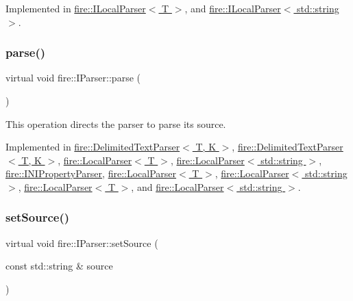 Implemented in \hyperlink{a00762_ad46898c516adcce38acbb4800dc9777b}{fire\+::\+I\+Local\+Parser$<$ T $>$}, and \hyperlink{a00762_ad46898c516adcce38acbb4800dc9777b}{fire\+::\+I\+Local\+Parser$<$ std\+::string $>$}.

\mbox{\label{a00770_af36ac6eedd8c27d2f418869193d7d03c}} 
\subsubsection{\texorpdfstring{parse()}{parse()}}
{\footnotesize\ttfamily virtual void fire\+::\+I\+Parser\+::parse (\begin{DoxyParamCaption}{ }\end{DoxyParamCaption})\hspace{0.3cm}{\ttfamily [pure virtual]}}

This operation directs the parser to parse its source. 

Implemented in \hyperlink{a00758_a773fa7ed28cb9d8c384ad94bd81fc93f}{fire\+::\+Delimited\+Text\+Parser$<$ T, K $>$}, \hyperlink{a00758_a686df5548771cae833d5e721442a821a}{fire\+::\+Delimited\+Text\+Parser$<$ T, K $>$}, \hyperlink{a00778_abd8929aea06c2dda40256d2e58236650}{fire\+::\+Local\+Parser$<$ T $>$}, \hyperlink{a00778_abd8929aea06c2dda40256d2e58236650}{fire\+::\+Local\+Parser$<$ std\+::string $>$}, \hyperlink{a00766_a31b6bad01e65ed4bb5f1ba297616c641}{fire\+::\+I\+N\+I\+Property\+Parser}, \hyperlink{a00778_ae904e264fe16708b3e434adea59e1b88}{fire\+::\+Local\+Parser$<$ T $>$}, \hyperlink{a00778_ae904e264fe16708b3e434adea59e1b88}{fire\+::\+Local\+Parser$<$ std\+::string $>$}, \hyperlink{a00778_a34fd9ffb0196c612c75b5288ed5e219b}{fire\+::\+Local\+Parser$<$ T $>$}, and \hyperlink{a00778_a34fd9ffb0196c612c75b5288ed5e219b}{fire\+::\+Local\+Parser$<$ std\+::string $>$}.

\mbox{\label{a00770_a0dbeff2b9bd8dbfb2aad7a424eef87d1}} 
\subsubsection{\texorpdfstring{set\+Source()}{setSource()}\hspace{0.1cm}{\footnotesize\ttfamily [1/2]}}
{\footnotesize\ttfamily virtual void fire\+::\+I\+Parser\+::set\+Source (\begin{DoxyParamCaption}\item[{const std\+::string \&}]{source }\end{DoxyParamCaption})\hspace{0.3cm}{\ttfamily [pure virtual]}}


